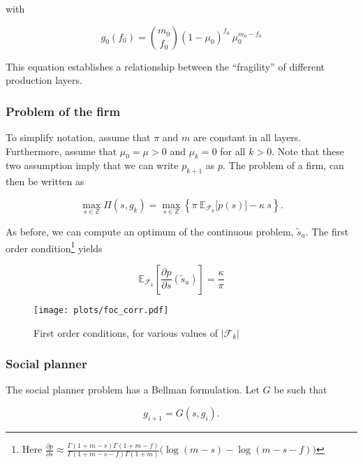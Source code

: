 \documentclass[american, abstract=on]{scrartcl}
\newcommand{\F}{\mathcal{F}}
\newcommand{\E}{\mathbb{E}}
\newcommand{\abs}[1]{\left\lvert#1\right\rvert}
\begin{document}
with

\begin{equation}
  g_0(f_0) = \binom{m_0}{f_0} (1 - \mu_0)^{f_{0}} \ \mu_0^{m_0 - f_{0}}
\end{equation}

This equation establishes a relationship between the ``fragility'' of different production layers.


\subsubsection{Problem of the firm}

To simplify notation, assume that $\pi$ and $m$ are constant in all layers. Furthermore, assume that $\mu_0 = \mu > 0$ and $\mu_k = 0$ for all $k > 0$. Note that these two assumption imply that we can write $p_{k+1}$ as $p$. The problem of a firm, can then be written as

\begin{equation}
  \max_{s \in \mathbb{Z}} \Pi(s, g_k) = \max_{s \in \mathbb{Z}} \left\{ \pi \ \E_{\F_k} \Big[ p(s) \Big] - \kappa \ s \right\}.
\end{equation}

As before, we can compute an optimum of the continuous problem, $\tilde{s}_a$. The first order condition\footnote{Here $\frac{\partial p}{\partial s} \approx \frac{\Gamma(1 + m - s) \Gamma(1 + m - f)}{\Gamma(1 + m - s - f) \Gamma(1 + m)} \Big(\log(m - s) - \log(m - s - f)\Big)$} yields

\begin{equation}
  \E_{\F_k} \left[ \frac{\partial p}{\partial s}(\tilde{s}_a ) \right] = \frac{\kappa}{\pi}
\end{equation}

\begin{figure}[H]
  \centering
  \texttt{[image: plots/foc\_corr.pdf]} 
  \caption{First order conditions, for various values of $\abs{\F_k}$}
  \label{fig:vert_foc_cor}
\end{figure}

\iffalse

\subsubsection{Social planner}

The social planner problem has a Bellman formulation. Let $G$ be such that  

\begin{equation}
  g_{i+1} = G(s, g_i).
\end{equation}
\end{document}
